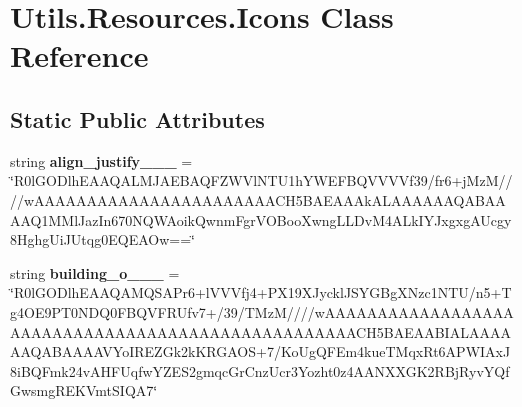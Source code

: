 \hypertarget{class_c_utils_1_1_utils_1_1_resources_1_1_icons}{}\section{Utils.\+Resources.\+Icons Class Reference}
\label{class_c_utils_1_1_utils_1_1_resources_1_1_icons}
\subsection*{Static Public Attributes}
\begin{DoxyCompactItemize}
\item 
\mbox{\label{class_c_utils_1_1_utils_1_1_resources_1_1_icons_a2ebfbf8215620ef13e68eab4c6594f34}} 
string {\bfseries align\+\_\+justify\+\_\+\_\+\_} = \char`\"{}R0l\+G\+O\+Dlh\+E\+A\+A\+Q\+A\+L\+M\+J\+A\+E\+B\+A\+Q\+F\+Z\+W\+Vl\+N\+T\+U1h\+Y\+W\+E\+F\+B\+Q\+V\+V\+V\+Vf39/fr6+j\+MzM////w\+A\+A\+A\+A\+A\+A\+A\+A\+A\+A\+A\+A\+A\+A\+A\+A\+A\+A\+A\+A\+A\+A\+A\+C\+H5\+B\+A\+E\+A\+A\+Ak\+A\+L\+A\+A\+A\+A\+A\+A\+Q\+A\+B\+A\+A\+A\+A\+Q1\+M\+Ml\+Jaz\+In670\+N\+Q\+W\+Aoik\+Qwnm\+Fgr\+V\+O\+Boo\+Xwng\+L\+L\+Dv\+M4\+A\+Lk\+I\+Y\+Jxgxg\+A\+Ucgy8\+Hghg\+Ui\+J\+Utqg0\+E\+Q\+E\+A\+Ow==\char`\"{}
\item 
\mbox{\label{class_c_utils_1_1_utils_1_1_resources_1_1_icons_a0b147d8423a738984a4177674381f719}} 
string {\bfseries building\+\_\+o\+\_\+\_\+\_} = \char`\"{}R0l\+G\+O\+Dlh\+E\+A\+A\+Q\+A\+M\+Q\+S\+A\+Pr6+l\+V\+V\+Vfj4+P\+X19\+X\+Jyckl\+J\+S\+Y\+G\+Bg\+X\+Nzc1\+N\+TU/n5+Tg4\+O\+E9\+P\+T0\+N\+D\+Q0\+F\+B\+Q\+V\+F\+R\+Ufv7+/39/T\+MzM////w\+A\+A\+A\+A\+A\+A\+A\+A\+A\+A\+A\+A\+A\+A\+A\+A\+A\+A\+A\+A\+A\+A\+A\+A\+A\+A\+A\+A\+A\+A\+A\+A\+A\+A\+A\+A\+A\+A\+A\+A\+A\+A\+A\+A\+A\+A\+A\+A\+A\+A\+A\+C\+H5\+B\+A\+E\+A\+A\+B\+I\+A\+L\+A\+A\+A\+A\+A\+A\+Q\+A\+B\+A\+A\+A\+A\+V\+Yo\+I\+R\+E\+Z\+Gk2k\+K\+R\+G\+A\+OS+7/Ko\+Ug\+Q\+F\+Em4kue\+T\+Mqx\+Rt6\+A\+P\+W\+I\+Ax\+J8i\+B\+Q\+Fmk24v\+A\+H\+F\+Uqfw\+Y\+Z\+E\+S2gmqc\+Gr\+Cnz\+Ucr3\+Yozht0z4\+A\+A\+N\+X\+X\+G\+K2\+R\+Bj\+Ryv\+Y\+Qf\+Gwsmg\+R\+E\+K\+Vmt\+S\+I\+Q\+A7\char`\"{}
\item 
\mbox{\label{class_c_utils_1_1_utils_1_1_resources_1_1_icons_a0c38d9eab3dea717f7bef609f0f33566}} 

\end{DoxyCompactItemize}
